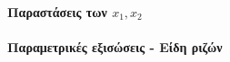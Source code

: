 \documentclass[11pt,a4paper,modern]{FFExercises}
\begin{document}
\paragraph{Παραστάσεις των $x_1,x_2$}
\paragraph{Παραμετρικές εξισώσεις - Είδη ριζών}
\askhsh
\end{document}
